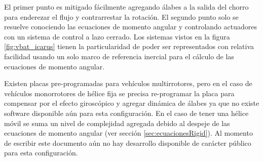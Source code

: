 El primer punto es mitigado fácilmente agregando álabes a la salida del chorro para enderezar el flujo y contrarrestar la rotación. El segundo punto solo se resuelve conociendo las ecuaciones de momento angular y controlando actuadores con un sistema de control a lazo cerrado. Los sistemas vistos en la figura \ref{fig:vbat_icarus} tienen la particularidad de poder ser representados con relativa facilidad usando un solo marco de referencia inercial para el cálculo de las ecuaciones de momento angular.

\medskip

Existen placas pre-programadas para vehículos multirrotores, pero en el caso de vehículos monorrotores de hélice fija se precisa re-programar la placa para compensar por el efecto giroscópico y agregar dinámica de álabes ya que no existe software disponible aún para esta configuración. En el caso de tener una hélice móvil se suma un nivel de complejidad agregada debido al despeje de las ecuaciones de momento angular (ver sección \ref{sec:ecuacionesRigid}). Al momento de escribir este documento aún no hay desarrollo disponible de carácter público para esta configuración.